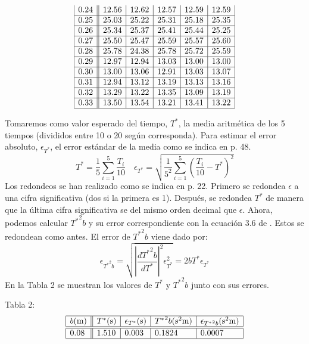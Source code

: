 \documentclass{article}
\begin{document}
\begin{multicols}{2}
\begin{center}
$$\begin{array}{|c||c|c|c|c|c|}
        0.24 & 12.56 & 12.62 & 12.57 & 12.59 & 12.59  \\ \hline
        0.25 & 25.03 & 25.22 & 25.31 & 25.18 & 25.35  \\ \hline
        0.26 & 25.34 & 25.37 & 25.41 & 25.44 & 25.25  \\ \hline
        0.27 & 25.50 & 25.47 & 25.59 & 25.57 & 25.60  \\ \hline
        0.28 & 25.78 & 24.38 & 25.78 & 25.72 & 25.59  \\ \hline
        0.29 & 12.97 & 12.94 & 13.03 & 13.00 & 13.00  \\ \hline
        0.30 & 13.00 & 13.06 & 12.91 & 13.03 & 13.07  \\ \hline
        0.31 & 12.94 & 13.12 & 13.19 & 13.13 & 13.16  \\ \hline
        0.32 & 13.29 & 13.22 & 13.35 & 13.09 & 13.19  \\ \hline
        0.33 & 13.50 & 13.54 & 13.21 & 13.41 & 13.22  \\ \hline
    \end{array}
$$
\end{center}
Tomaremos como valor esperado del tiempo, $T^*$, la media aritmética de los 5 tiempos (divididos entre 10 o 20 según corresponda). Para estimar el error absoluto, $\epsilon_{T^*}$, el error estándar de la media como se indica en \cite{manual} p. 48.
$$
T^* = \frac{1}{5} \sum_{i=1}^5 \frac{T_i}{10} \quad
\epsilon_{T^*} = \sqrt{\frac{1}{5^2} \sum_{i=1}^5 (\frac{T_i}{10} - T^*)^2}
$$
Los redondeos se han realizado como se indica en \cite{manual} p. 22. Primero se redondea $\epsilon$ a una cifra significativa (dos si la primera es 1). Después, se redondea $T^*$ de manera que la última cifra significativa se del mismo orden decimal que $\epsilon$. Ahora, podemos calcular ${T^*}^2b$ y su error correspondiente con la ecuación 3.6 de \cite{manual}. Estos se redondean como antes. El error de ${T^*}^2b$ viene dado por:
$$
\epsilon_{{T^*}^2b} =
\sqrt{\left| \frac{d {T^*}^2b}{d T^*} \right|^2 \epsilon_{T^*}^2}=
2bT^* \epsilon_{T^*}
$$
En la Tabla 2 se muestran los valores de $T^*$ y ${T^*}^2b$ junto con sus errores.
\begin{center}
Tabla 2:
$$
  \begin{array}{|l||l|l|l|l|} \hline
    b\text{(m)} & T^*\text{(s)} & \epsilon_{T^*}\text{(s)} & {T^*}^2b\text{(s\textsuperscript{2}m)} & \epsilon_{{T^*}^2b}\text{(s\textsuperscript{2}m)}\\ \hline \hline
    0.08 & 1.510 & 0.003 & 0.1824 & 0.0007  \\ \hline

\end{array}$$
\end{center}
\end{multicols}
\end{document}
